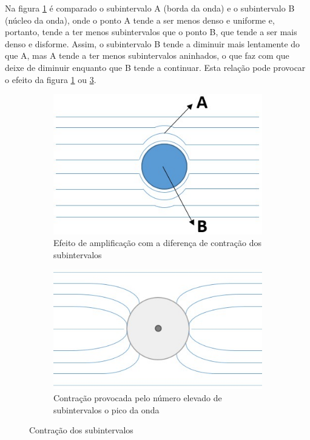 Na figura \ref{fig:consciousness_space_3D_plan_subinterval_amplify} é comparado o subintervalo A (borda da onda) e o subintervalo B (núcleo da onda), onde o ponto A tende a ser menos denso e uniforme e, portanto, tende a ter menos subintervalos que o ponto B, que tende a ser mais denso e disforme. Assim, o subintervalo B tende a diminuir mais lentamente do que A, mas A tende a ter menos subintervalos aninhados, o que faz com que deixe de diminuir enquanto que B tende a continuar. Esta relação pode provocar o efeito da figura \ref{fig:consciousness_space_3D_plan_subinterval_amplify} ou \ref{fig:consciousness_space_3D_plan_subinterval_contract}.
	\begin{figure}[H]
	\centering
		\begin{subfigure}[H]{0.65\linewidth}
		\centering
		\includegraphics[width=1\linewidth]{sections/images/consciousness_space_3D_plan_subinterval_amplify.jpg}
		\caption{Efeito de amplificação com a diferença de contração dos subintervalos}
		\label{fig:consciousness_space_3D_plan_subinterval_amplify}
		\end{subfigure}
	
		\begin{subfigure}[H]{0.65\linewidth}
		\centering
		\includegraphics[width=1\linewidth]{sections/images/consciousness_space_3D_plan_subinterval_contract.jpg}
		\caption{Contração provocada pelo número elevado de subintervalos o pico da onda}
		\label{fig:consciousness_space_3D_plan_subinterval_contract}
		\end{subfigure}%
	\caption{Contração dos subintervalos}
	\end{figure}
	
